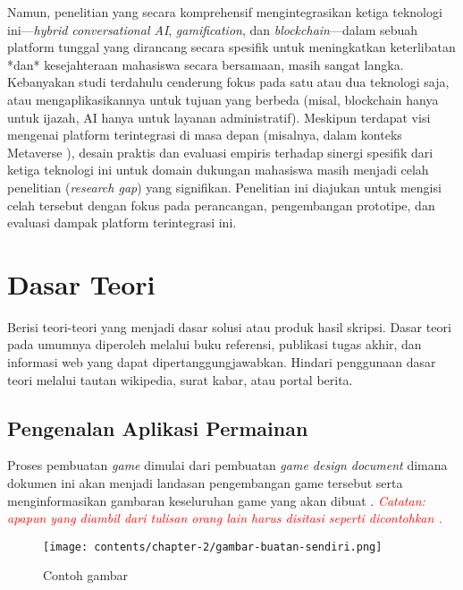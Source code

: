 Namun, penelitian yang secara komprehensif mengintegrasikan ketiga teknologi ini—\textit{hybrid conversational AI}, \textit{gamification}, dan \textit{blockchain}—dalam sebuah platform tunggal yang dirancang secara spesifik untuk meningkatkan keterlibatan *dan* kesejahteraan mahasiswa secara bersamaan, masih sangat langka. Kebanyakan studi terdahulu cenderung fokus pada satu atau dua teknologi saja, atau mengaplikasikannya untuk tujuan yang berbeda (misal, blockchain hanya untuk ijazah, AI hanya untuk layanan administratif). Meskipun terdapat visi mengenai platform terintegrasi di masa depan (misalnya, dalam konteks Metaverse \cite{integrated_metaverse_blockchain_ai_education_2025}), desain praktis dan evaluasi empiris terhadap sinergi spesifik dari ketiga teknologi ini untuk domain dukungan mahasiswa masih menjadi celah penelitian (\textit{research gap}) yang signifikan. Penelitian ini diajukan untuk mengisi celah tersebut dengan fokus pada perancangan, pengembangan prototipe, dan evaluasi dampak platform terintegrasi ini.


\section{Dasar Teori}

Berisi teori-teori yang menjadi dasar solusi atau produk hasil skripsi. Dasar teori pada umumnya diperoleh melalui buku referensi, publikasi tugas akhir, dan informasi web yang dapat dipertanggungjawabkan. Hindari penggunaan dasar teori melalui tautan wikipedia, surat kabar, atau portal berita.

\subsection{Pengenalan Aplikasi Permainan}

Proses pembuatan \textit{game} dimulai dari pembuatan \textit{game design document} dimana 
dokumen ini akan menjadi landasan pengembangan game tersebut serta menginformasikan gambaran keseluruhan game yang akan dibuat \cite{ferdiana2012agile}. \textcolor{red}{\textit{Catatan: apapun yang diambil dari tulisan orang lain harus disitasi seperti dicontohkan \cite{ferdiana2012agile}.}}

\begin{figure}[h]
	\centering
	\texttt{[image: contents/chapter-2/gambar-buatan-sendiri.png]}
	\caption[Contoh gambar]{Contoh gambar \cite{lukito2016}}
	\label{Fig:gambar-buatan-sendiri}
\end{figure}



